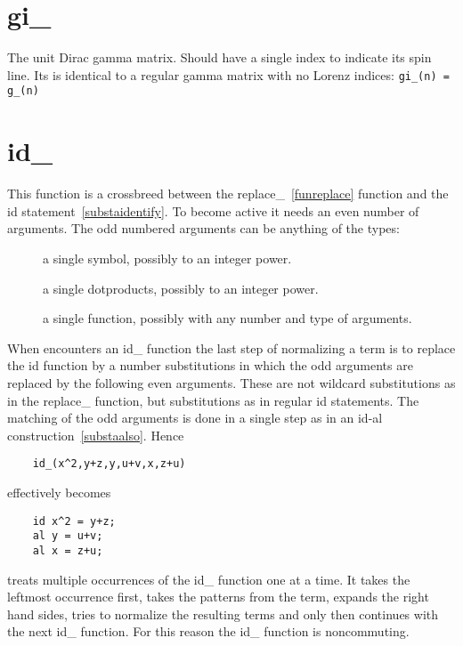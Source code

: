 
\section{gi\_}
\label{fungi}
\noindent The unit Dirac gamma matrix. Should have a single index 
to indicate its spin line. Its is identical to a regular gamma matrix with 
no Lorenz indices: \verb:gi_(n) = g_(n):


\section{id\_}
\label{funid}
\noindent This function is a crossbreed between the 
replace\_~\ref{funreplace} function and the id 
statement~\ref{substaidentify}. To become active it 
needs an even number of arguments. The odd numbered arguments can be 
anything of the types:
\begin{description}
\item[] a single symbol, possibly to an integer power.
\item[] a single dotproducts, possibly to an integer power.
\item[] a single function, possibly with any number and type of arguments.
\end{description}
When \FORM{} encounters an id\_ function the last step of normalizing a term 
is to replace the id function by a number substitutions in which the odd 
arguments are replaced by the following even arguments. These are not 
wildcard substitutions as in the replace\_ function, but substitutions as 
in regular id statements. The matching of the odd arguments is done in a 
single step as in an id-al construction~\ref{substaalso}. Hence
\begin{verbatim}
    id_(x^2,y+z,y,u+v,x,z+u)
\end{verbatim}
effectively becomes
\begin{verbatim}
    id x^2 = y+z;
    al y = u+v;
    al x = z+u;
\end{verbatim}
\FORM{} treats multiple occurrences of the id\_ function one at a time. It 
takes the leftmost occurrence first, takes the patterns from the term, 
expands the right hand sides, tries to normalize the resulting terms and 
only then continues with the next id\_ function. For this reason the id\_ 
function is noncommuting.

